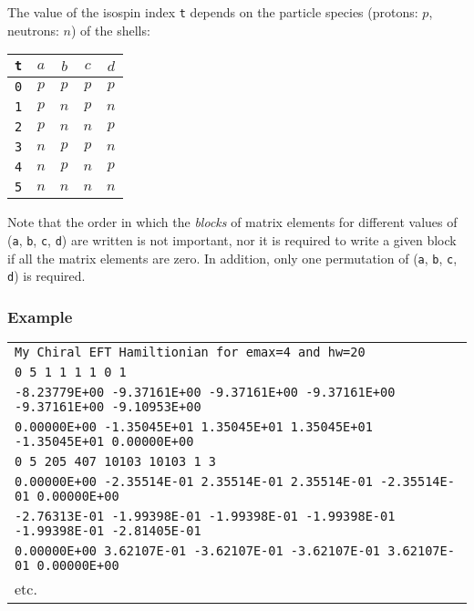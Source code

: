 \documentclass[a4paper,11pt]{article}
\renewcommand{\tt}[1]{\texttt{#1}}
\begin{document}
The value of the isospin index \tt{t} depends on the particle species (protons: $p$, neutrons: $n$) of the shells:
\begin{center}
\begin{tabular}{|c|c|c|c|c|}
\hline
 \tt{t} & $a$ & $b$ & $c$ & $d$ \\
\hline                   
 \tt{0} & $p$ & $p$ & $p$ & $p$ \\
 \tt{1} & $p$ & $n$ & $p$ & $n$ \\
 \tt{2} & $p$ & $n$ & $n$ & $p$ \\
 \tt{3} & $n$ & $p$ & $p$ & $n$ \\
 \tt{4} & $n$ & $p$ & $n$ & $p$ \\
 \tt{5} & $n$ & $n$ & $n$ & $n$ \\
\hline
\end{tabular}
\end{center}

Note that the order in which the \emph{blocks} of matrix elements for different values of (\tt{a}, \tt{b}, \tt{c}, \tt{d}) are written is not important, 
nor it is required to write a given block if all the matrix elements are zero. In addition, only one permutation of (\tt{a}, \tt{b}, \tt{c}, \tt{d}) 
is required.

\subsubsection*{Example}
\begin{center}
\begin{tabular}{|l|}
\hline
 \tt{My Chiral EFT Hamiltionian for emax=4 and hw=20} \\
 \tt{0   5       \phantom{10}1      \phantom{10}1      \phantom{1000}1      \phantom{1000}1    0   1} \\
 \tt{-8.23779E+00 -9.37161E+00 -9.37161E+00 -9.37161E+00 -9.37161E+00 -9.10953E+00} \\
 \tt{\phantom{-}0.00000E+00 -1.35045E+01 \phantom{-}1.35045E+01 \phantom{-}1.35045E+01 -1.35045E+01 \phantom{-}0.00000E+00} \\
 \tt{0   5     205    407  10103  10103    1   3} \\
 \tt{\phantom{-}0.00000E+00 -2.35514E-01 \phantom{-}2.35514E-01 \phantom{-}2.35514E-01 -2.35514E-01 \phantom{-}0.00000E+00} \\
 \tt{-2.76313E-01 -1.99398E-01 -1.99398E-01 -1.99398E-01 -1.99398E-01 -2.81405E-01} \\
 \tt{\phantom{-}0.00000E+00 \phantom{-}3.62107E-01 -3.62107E-01 -3.62107E-01 \phantom{-}3.62107E-01 \phantom{-}0.00000E+00} \\
        \phantom{00000000000} etc.  \\
\hline
\end{tabular}
\end{center}
\end{document}
